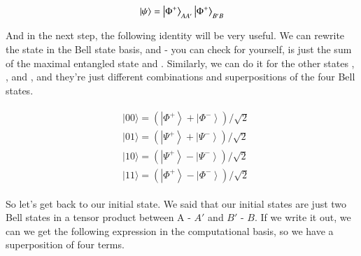 \begin{align}
    \left| \psi \right\rangle=\left| \Phi^{+} \right\rangle_{A A^{\prime}}\left| \Phi^{+} \right\rangle_{B^{\prime} B}
\end{align}

And in the next step, the following identity will be very useful. We can rewrite the state  in the Bell state basis, and - you can check for yourself, is just the sum of the maximal entangled state  \ket{\Phi^+} and \ket. Similarly, we can do it for the other states , , and , and they're just different combinations and superpositions of the four Bell states.

\begin{align}
    \begin{aligned}
&|00\rangle=\left(\left|\Phi^{+}\right\rangle+\left|\Phi^{-}\right\rangle\right) / \sqrt{2} \\
&|01\rangle=\left(\left|\Psi^{+}\right\rangle+\left|\Psi^{-}\right\rangle\right) / \sqrt{2} \\
&|10\rangle=\left(\left|\Psi^{+}\right\rangle-\left|\Psi^{-}\right\rangle\right) / \sqrt{2} \\
&|11\rangle=\left(\left|\Phi^{+}\right\rangle-\left|\Phi^{-}\right\rangle\right) / \sqrt{2}
\end{aligned}
\end{align}

So let's get back to our initial state. We said that our initial states are just two Bell states  \ket{\Phi^+} in a tensor product between A -  $A'$ and $B'$ -  $B$. If we write it out, we can we get the following expression in the computational basis, so we have a superposition of four terms. 

